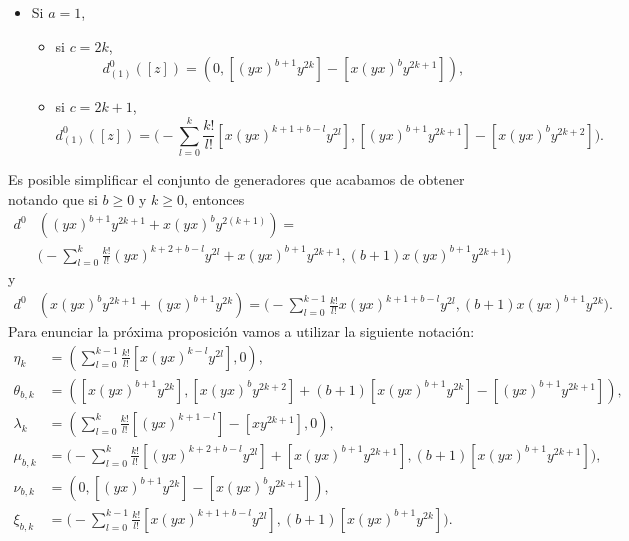\documentclass[fleqn,../tesis.tex]{subfiles}
\begin{document}
\begin{itemize}
\begin{itemize}
     \end{itemize}
     \item Si $a = 1$,
     \begin{itemize}
          \item si $c = 2k$,
          \[
               d^{0}_{(1)}([z]) = \left(0, \left[(yx)^{b + 1}y^{2k}\right] - \left[x(yx)^by^{2k + 1}\right] \right),          
          \]
          \item si $c = 2k + 1$,
          \[
              d^{0}_{(1)}([z]) = \Bigg(-\sum_{l = 0}^{k}\frac{k!}{l!}\left[x(yx)^{k + 1 + b - l}y^{2l}\right],
                  \left[(yx)^{b + 1}y^{2k + 1}\right] - \left[x(yx)^{b}y^{2k + 2}\right]\Bigg).
          \]      
     \end{itemize}
\end{itemize}
Es posible simplificar el conjunto de generadores que acabamos de obtener notando que si $b \geq 0$ y $k \geq 0$, entonces
\begin{align*}
    d^{0}&\left((yx)^{b + 1}y^{2k + 1} + x(yx)^{b}y^{2(k + 1)}\right) = \\
    & \Bigg(-\sum_{l = 0}^{k}\frac{k!}{l!}(yx)^{k + 2 + b - l}y^{2l}
                    + x(yx)^{b + 1}y^{2k + 1}, (b + 1) x(yx)^{b + 1}y^{2k + 1}\Bigg)
\end{align*}
y
\begin{align*}
    d^{0}&\left(x(yx)^by^{2k + 1} + (yx)^{b + 1}y^{2k}\right) = \Bigg(-\sum_{l = 0}^{k - 1}\frac{k!}{l!}x(yx)^{k + 1 + b - l}y^{2l},
                  (b + 1)x(yx)^{b + 1}y^{2k}\Bigg).
\end{align*}
Para enunciar la próxima proposición vamos a utilizar la siguiente notación:
\begin{align*}
    \eta_k &= \left(\sum_{l = 0}^{k - 1}\frac{k!}{l!}\left[x(yx)^{k -l}y^{2l}\right], 0\right),\\
    \theta_{b,k} &= \left(\left[x(yx)^{b + 1}y^{2k}\right], \left[x(yx)^{b}y^{2k + 2}\right] + (b + 1)\left[x(yx)^{b  + 1}y^{2k}\right] 
        - \left[(yx)^{b + 1}y^{2k + 1}\right]\right),\\
    \lambda_{k} &= \left(\sum_{l = 0}^{k}\frac{k!}{l!}\left[(yx)^{k + 1 - l}\right] - \left[xy^{2k + 1}\right], 0\right),\\
    \mu_{b, k} &= \Bigg(-\sum_{l = 0}^{k}\frac{k!}{l!}\left[(yx)^{k + 2 + b - l}y^{2l}\right]
                    + \left[x(yx)^{b + 1}y^{2k + 1}\right], (b + 1) \left[x(yx)^{b + 1}y^{2k + 1}\right]\Bigg),\\
    \nu_{b , k} &=\left(0, \left[(yx)^{b + 1}y^{2k}\right] - \left[x(yx)^{b}y^{2k + 1}\right]\right),\\
    \xi_{b, k} &= \Bigg(-\sum_{l = 0}^{k - 1}\frac{k!}{l!}\left[x(yx)^{k + 1 + b - l}y^{2l}\right],
                  (b + 1)\left[x(yx)^{b + 1}y^{2k}\right]\Bigg).
\end{align*}
\end{document}
